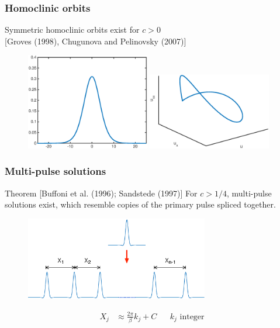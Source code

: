 \documentclass[16pt]{beamer}
\begin{document}
\begin{frame}
	\frametitle{Homoclinic orbits}
	\fontsize{16}{7.2}\selectfont

	Symmetric homoclinic orbits exist for $c > 0$ \\ \footnotesize [Groves (1998), Chugunova and Pelinovsky (2007)]

	\begin{figure}
   		\includegraphics[width=0.48\textwidth]{images/exactsol}
   		\includegraphics[width=0.48\textwidth]{images/exactsolorbit}
	\end{figure}
\end{frame}

\begin{frame}
\frametitle{Multi-pulse solutions} 
	\fontsize{16}{7.2}\selectfont
    \begin{block}{Theorem [Buffoni et al. (1996); Sandstede (1997)]}
    For $c > 1/4$, multi-pulse solutions exist, which resemble copies of the primary pulse spliced together.

	\begin{figure}
	\begin{center}
	\includegraphics[width=8cm]{images/multipulse.eps}
	\end{center}
	\begin{align*}
	 X_j &\approx \frac{2 \pi}{\beta} k_j + C && k_j \text{ integer}
	\end{align*}
	\end{figure}

    \end{block}
\end{frame}
\end{document}
